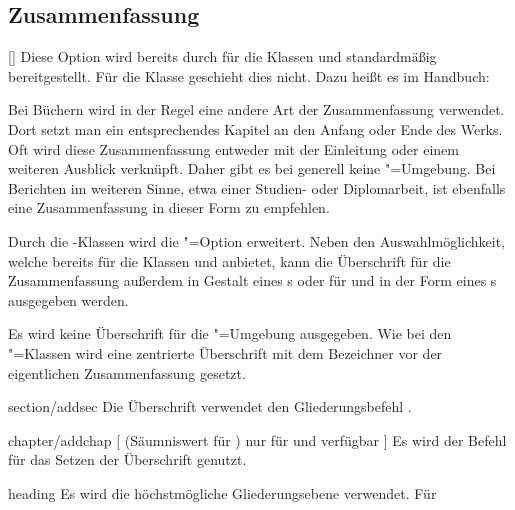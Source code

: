\subsection{Zusammenfassung}
\begin{Declaration}{[\PSet]}%
\printdeclarationlist%
%
%
%
Diese Option wird bereits durch \KOMAScript{} für die Klassen  
und  standardmäßig bereitgestellt. Für die Klasse 
 geschieht dies nicht. Dazu heißt es im Handbuch:
%
\begin{quoting}
Bei Büchern wird in der Regel eine andere Art der Zusammenfassung verwendet. 
Dort setzt man ein entsprechendes Kapitel an den Anfang oder Ende des Werks. 
Oft wird diese Zusammenfassung entweder mit der Einleitung oder einem weiteren 
Ausblick verknüpft. Daher gibt es bei  generell keine 
"=Umgebung. Bei Berichten im weiteren Sinne, etwa einer 
Studien- oder Diplomarbeit, ist ebenfalls eine Zusammenfassung in dieser Form 
zu empfehlen.
\end{quoting}
%
Durch die \TUDScript-Klassen wird die "=Option erweitert. 
Neben den Auswahlmöglichkeit, welche bereits \KOMAScript{} für die Klassen 
 und  anbietet, kann die Überschrift für 
die Zusammenfassung außerdem in Gestalt eines \sectionautorefname{}s oder für 
 und  in der Form eines 
\chapterautorefname{}s ausgegeben werden.
%
\begin{values}
  Es wird keine Überschrift für die "=Umgebung ausgegeben.
  Wie bei den \KOMAScript"=Klassen wird eine zentrierte Überschrift mit dem 
  Bezeichner  vor der eigentlichen Zusammenfassung gesetzt.
\item[section/addsec]
  Die Überschrift verwendet den Gliederungsbefehl .
\item[chapter/addchap][%
    (Säumniswert für \Class{tudscrbook})
    nur für \Class{tudscrreprt} und \Class{tudscrbook} verfügbar%
  ]
  Es wird der Befehl  für das Setzen der Überschrift genutzt. 
\item[heading]
  Es wird die höchstmögliche Gliederungsebene verwendet. Für 

\end{values}
\end{Declaration}
